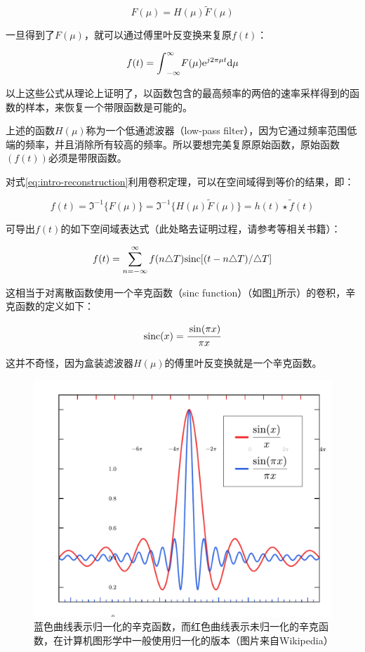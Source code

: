 \begin{equation}\label{eq:intro-reconstruction}
	F(\mu)=H(\mu)\tilde{F}(\mu)
\end{equation}

\noindent 一旦得到了$F(\mu)$，就可以通过傅里叶反变换来复原$f(t)$：

\begin{equation}
	f(t)={\rm \int}^{\infty}_{-\infty}F(\mu){\rm e}^{j2\pi\mu t} {\rm d}\mu
\end{equation}

\noindent 以上这些公式从理论上证明了，以函数包含的最高频率的两倍的速率采样得到的函数的样本，来恢复一个带限函数是可能的。

上述的函数$H(\mu)$称为一个低通滤波器（low-pass filter），因为它通过频率范围低端的频率，并且消除所有较高的频率。所以要想完美复原原始函数，原始函数$(f(t))$必须是带限函数。

对式\ref{eq:intro-reconstruction}利用卷积定理，可以在空间域得到等价的结果，即：

\begin{equation}
	f(t)=\Im^{-1}\{F(\mu)\}=\Im^{-1}\{H(\mu)\tilde{F}(\mu) \}=h(t)\star\tilde{f}(t)
\end{equation}

\noindent 可导出$f(t)$的如下空间域表达式（此处略去证明过程，请参考\cite{b:DigitalImageProcessing}等相关书籍）：

\begin{equation}\label{eq:intro-reconstruction-1}
	f(t)=\sum^{\infty}_{n=-\infty}f(n\triangle T) {\rm sinc}[(t-n\triangle T)/\triangle T]
\end{equation}

\noindent 这相当于对离散函数使用一个辛克函数（sinc function）（如图\ref{f:intro-sinc}所示）的卷积，辛克函数的定义如下：

\begin{equation}
	{\rm sinc}(x)= \cfrac{\sin (\pi x)}{\pi x}
\end{equation}

\noindent 这并不奇怪，因为盒装滤波器$H(\mu)$的傅里叶反变换就是一个辛克函数。

\begin{figure}
\sidecaption
	\includegraphics[width=.65\textwidth]{figures/intro/sinc}
	\caption{蓝色曲线表示归一化的辛克函数，而红色曲线表示未归一化的辛克函数，在计算机图形学中一般使用归一化的版本（图片来自Wikipedia）}
	\label{f:intro-sinc}
\end{figure}

